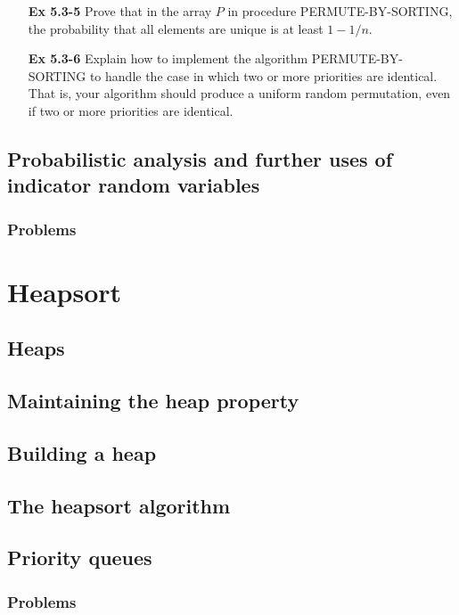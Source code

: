 \documentclass[fontsize=12pt,paper=a4]{book}
\begin{document}
\begin{enumerate}
	\item[\textbf{Ex 5.3-5}]
		Prove that in the array $P$ in procedure PERMUTE-BY-SORTING, the probability that all elements are unique is at least $1-1/n$.
		
	\item[\textbf{Ex 5.3-6}]
		Explain how to implement the algorithm PERMUTE-BY-SORTING to handle the case in which two or more priorities are identical. That is, your algorithm should produce a uniform random permutation, even if two or more priorities are identical.
\end{enumerate}
	
\section{Probabilistic analysis and further uses of indicator random variables}

\subsection*{Problems}


\chapter{Heapsort}

\section{Heaps}

\section{Maintaining the heap property}

\section{Building a heap}

\section{The heapsort algorithm}

\section{Priority queues}

\subsection*{Problems}
\end{document}
